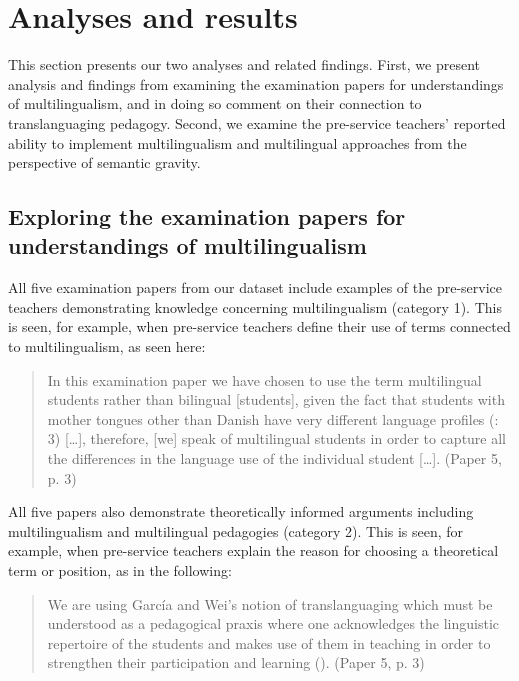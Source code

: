 \documentclass[output=paper]{langscibook}
\begin{document}
\section{Analyses and results}\label{sec:ostergaard:5}

This section presents our two analyses and related findings. First, we present analysis and findings from examining the examination papers for understandings of multilingualism, and in doing so comment on their connection to translanguaging pedagogy. Second, we examine the pre-service teachers’ reported ability to implement multilingualism and multilingual approaches from the perspective of semantic gravity.

\subsection{Exploring the examination papers for understandings of multilingualism}\label{sec:ostergaard:5.1}

All five examination papers from our dataset include examples of the pre-service teachers demonstrating knowledge concerning multilingualism (category 1). This is seen, for example, when pre-service teachers define their use of terms connected to multilingualism, as seen here:

\begin{quote}
In this examination paper we have chosen to use the term multilingual students rather than bilingual [students], given the fact that students with mother tongues other than Danish have very different language profiles (\citealt{KnudsenWulff2017}: 3) […], therefore, [we] speak of multilingual students in order to capture all the differences in the language use of the individual student […]. (Paper 5, p. 3) 
\end{quote}

All five papers also demonstrate theoretically informed arguments including multilingualism and multilingual pedagogies (category 2). This is seen, for example, when pre-service teachers explain the reason for choosing a theoretical term or position, as in the following:

\begin{quote}
We are using García and Wei's notion of translanguaging which must be understood as a pedagogical praxis where one acknowledges the linguistic repertoire of the students and makes use of them in teaching in order to strengthen their participation and learning (\citealt[14]{HolmenThise2019}). (Paper 5, p. 3)
\end{quote}
\end{document}
